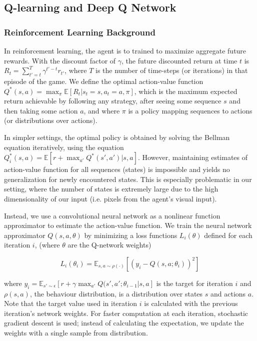 \documentclass{article}
\begin{document}
\begin{multicols}{2}
\subsection{Q-learning and Deep Q Network}

\subsubsection{Reinforcement Learning Background}

In reinforcement learning, the agent is to trained to maximize aggregate future rewards. With the discount factor of $\gamma$, the future discounted return at time $t$ is $R_t = \sum_{t' = t}^T \gamma^{t' - t}r_{t'}$, where $T$ is the number of time-steps (or iterations) in that episode of the game.
We define the optimal action-value function
$Q^{*}(s, a) = \max_\pi \mathbb{E}[R_t | s_t = s, a_t = a, \pi]$,
which is the maximum expected return achievable by following any strategy,
after seeing some sequence $s$ and then taking some action $a$, and where $\pi$ is a policy mapping sequences to actions (or distributions over actions).

In simpler settings, the optimal policy is obtained by solving the Bellman equation iteratively, using the equation $Q_i^*(s,a) = \mathbb{E}[r +  \max_{a'} Q^* (s', a' )| s, a]$.
However, maintaining estimates of action-value function for all sequences (states) is impossible and yields no generalization for newly encountered states.
This is especially problematic in our setting, where the number of states is extremely large due to the high dimensionality of our input (i.e. pixels from the agent's visual input).

Instead, we use a convolutional neural network as a nonlinear function approximator to estimate the action-value function. We train the neural network approximator $Q(s,a,\theta)$ by minimizing a loss functions $L_i(\theta)$ defined for each iteration $i$, (where $\theta$ are the Q-network weights)

\begin{equation*}
    L_i(\theta_i) = \mathbb{E}_{s,a \sim \rho(·)} [(y_i - Q (s, a; \theta_i))^2]
\end{equation*}


where $y_i = \mathbb{E}_{s' \sim \epsilon}[r + \gamma \max_{a'} Q(s', a'; \theta_{i-1} | s, a]$ is the target for iteration $i$ and $\rho(s, a)$, the behaviour distribution, is a distribution over states $s$ and actions $a$.
Note that the target value used in iteration $i$ is calculated with the previous iteration's network weights. For faster computation at each iteration, stochastic gradient descent is used; instead of calculating the expectation, we update the weights with a single sample from distribution.


\end{multicols}
\end{document}
